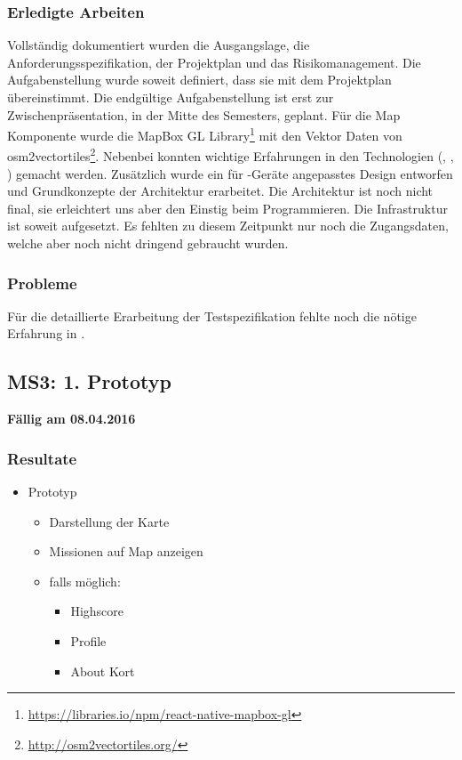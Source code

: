\subsubsection{Erledigte Arbeiten}
Vollständig dokumentiert wurden die Ausgangslage, die Anforderungsspezifikation, der Projektplan und das Risikomanagement.
Die Aufgabenstellung wurde soweit definiert, dass sie mit dem Projektplan übereinstimmt.
Die endgültige Aufgabenstellung ist erst zur Zwischenpräsentation, in der Mitte des Semesters, geplant.
Für die Map Komponente wurde die MapBox GL Library\footnote{\url{https://libraries.io/npm/react-native-mapbox-gl}} mit den Vektor Daten von osm2vectortiles\footnote{\url{http://osm2vectortiles.org/}}.
Nebenbei konnten wichtige Erfahrungen in den Technologien (, , ) gemacht werden.
Zusätzlich wurde ein für -Geräte angepasstes Design entworfen und Grundkonzepte der Architektur erarbeitet.
Die Architektur ist noch nicht final, sie erleichtert uns aber den Einstig beim Programmieren.
Die Infrastruktur ist soweit aufgesetzt.
Es fehlten zu diesem Zeitpunkt nur noch die Zugangsdaten, welche aber noch nicht dringend gebraucht wurden.

\subsubsection{Probleme}
Für die detaillierte Erarbeitung der Testspezifikation fehlte noch die nötige Erfahrung in .


\subsection{MS3: 1. Prototyp}
\label{pm-ms3}
\textbf{Fällig am 08.04.2016}
\subsubsection{Resultate}
\begin{itemize}
	\item {} Prototyp
	\begin{itemize}
		\item Darstellung der Karte
		\item Missionen auf Map anzeigen
		\item falls möglich:
		\begin{itemize}
			\item Highscore
			\item Profile
			\item About Kort
		\end{itemize}
	\end{itemize}
\end{itemize}

